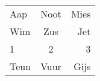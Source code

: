
\begin{tabular}{lcr}
  Aap  & Noot & Mies \\
  Wim  & Zus  & Jet  \\
  1    & 2    & 3    \\
  Teun & Vuur & Gijs \\
\end{tabular}
